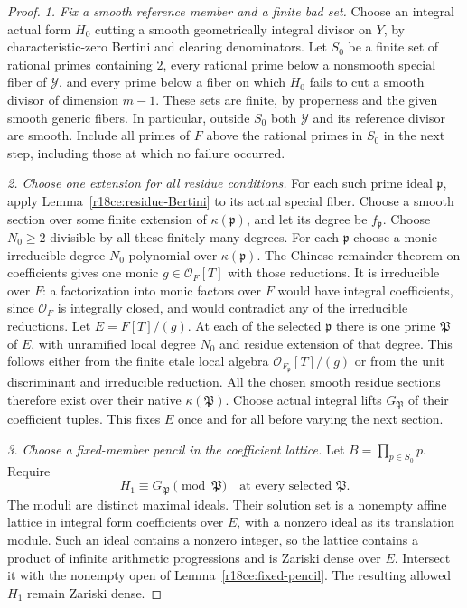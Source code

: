 \begin{proof}
\emph{1. Fix a smooth reference member and a finite bad set.}
Choose an integral actual form $H_0$ cutting a smooth
geometrically integral divisor on $Y$, by characteristic-zero
Bertini and clearing denominators.
Let $S_0$ be a finite set of rational primes containing
$2$, every rational prime below a nonsmooth special fiber
of $\mathcal Y$, and every prime below a fiber on which
$H_0$ fails to cut a smooth divisor of dimension $m-1$.
These sets are finite, by properness and the given
smooth generic fibers.  In particular, outside $S_0$
both $\mathcal Y$ and its reference divisor are smooth.
Include all primes of $F$ above the rational primes
in $S_0$ in the next step, including those at which
no failure occurred.

\emph{2. Choose one extension for all residue conditions.}
For each such prime ideal $\mathfrak p$, apply
Lemma~\ref{r18ce:residue-Bertini} to its actual special
fiber.  Choose a smooth section over some finite
extension of $\kappa(\mathfrak p)$, and let its degree
be $f_{\mathfrak p}$.  Choose $N_0\ge2$ divisible by
all these finitely many degrees.
For each $\mathfrak p$ choose a monic irreducible
degree-$N_0$ polynomial over $\kappa(\mathfrak p)$.
The Chinese remainder theorem on coefficients gives
one monic $g\in\mathcal O_F[T]$ with those reductions.
It is irreducible over $F$: a factorization into
monic factors over $F$ would have integral
coefficients, since $\mathcal O_F$ is integrally
closed, and would contradict any of the irreducible
reductions.  Let $E=F[T]/(g)$.
At each of the selected $\mathfrak p$ there is one
prime $\mathfrak P$ of $E$, with unramified local
degree $N_0$ and residue extension of that degree.
This follows either from the finite etale local
algebra $\mathcal O_{F_{\mathfrak p}}[T]/(g)$ or
from the unit discriminant and irreducible reduction.
All the chosen smooth residue sections therefore
exist over their native $\kappa(\mathfrak P)$.
Choose actual integral lifts $G_{\mathfrak P}$ of
their coefficient tuples.  This fixes $E$ once and
for all before varying the next section.

\emph{3. Choose a fixed-member pencil in the coefficient lattice.}
Let $B=\prod_{p\in S_0}p$.  Require
\[
       H_1\equiv G_{\mathfrak P}\pmod{\mathfrak P}
          \quad\text{at every selected }\mathfrak P.
 \tag{CE18.2}\label{r18ce:coefficient-CRT}
\]
The moduli are distinct maximal ideals.  Their solution
set is a nonempty affine lattice in integral form
coefficients over $E$, with a nonzero ideal as its
translation module.  Such an ideal contains a
nonzero integer, so the lattice contains a product
of infinite arithmetic progressions and is Zariski
dense over $E$.  Intersect it with the nonempty open
of Lemma~\ref{r18ce:fixed-pencil}.  The resulting
allowed $H_1$ remain Zariski dense.


\end{proof}
